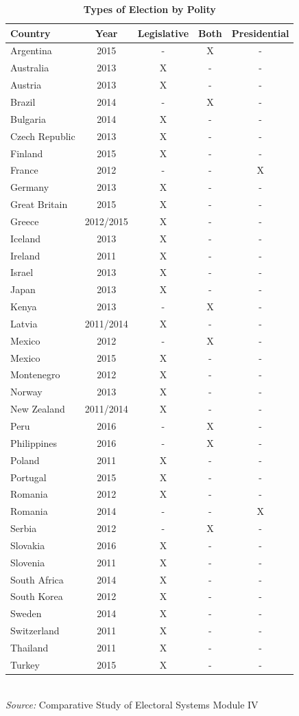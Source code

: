 \documentclass[12pt, titlepage]{article}
\newcommand\e{\emph}
\newcommand\tb{\textbf}
\begin{document}
\begin{table}
	\centering
	\caption{\tb{Types of Election by Polity}}
	\begin{tabulary}{\textwidth}{l c c c c} 
		\hline
		\tb{Country}&\tb{Year}&\tb{Legislative}&\tb{Both}&\tb{Presidential}\\
		\hline
		Argentina&2015&-&X&-\\
		Australia&2013&X&-&-\\
		Austria&2013&X&-&-\\
		Brazil&2014&-&X&-\\
		Bulgaria&2014&X&-&-\\
		Czech Republic&2013&X&-&-\\
		Finland&2015&X&-&-\\
		France&2012&-&-&X\\
		Germany&2013&X&-&-\\ 
		Great Britain&2015&X&-&-\\
		Greece&2012/2015&X&-&-\\
		Iceland&2013&X&-&-\\
		Ireland&2011&X&-&-\\
		Israel&2013&X&-&-\\
		Japan&2013&X&-&-\\
		Kenya&2013&-&X&-\\
		Latvia&2011/2014&X&-&-\\
		Mexico&2012&-&X&-\\
		Mexico&2015&X&-&-\\
		Montenegro&2012&X&-&-\\
		Norway&2013&X&-&-\\
		New Zealand&2011/2014&X&-&-\\
		Peru&2016&-&X&-\\
		Philippines&2016&-&X&-\\
		Poland&2011&X&-&-\\
		Portugal&2015&X&-&-\\	
		Romania&2012&X&-&-\\
		Romania&2014&-&-&X\\
		Serbia&2012&-&X&-\\
		Slovakia&2016&X&-&-\\
		Slovenia&2011&X&-&-\\
		South Africa&2014&X&-&-\\ 
		South Korea&2012&X&-&-\\
		Sweden&2014&X&-&-\\
		Switzerland&2011&X&-&-\\
		Thailand&2011&X&-&-\\
		Turkey&2015&X&-&-\\
		\hline
	\end{tabulary} \\
	\e{Source:} Comparative Study of Electoral Systems Module IV 
	\label{table1}
\end{table}
\end{document}
